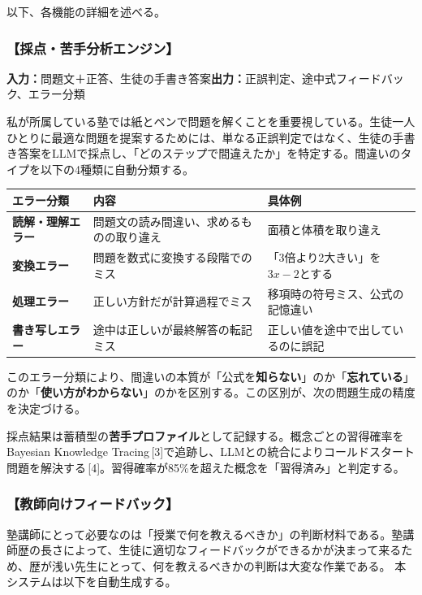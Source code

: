 \documentclass[paper=a4,fontsize=10.5bp,jafontsize=10.5bp,twocolumn]{jlreq}
\begin{document}
以下、各機能の詳細を述べる。

\subsubsection{【採点・苦手分析エンジン】}

\noindent\textbf{入力：}問題文＋正答、生徒の手書き答案\quad\textbf{出力：}正誤判定、途中式フィードバック、エラー分類

私が所属している塾では紙とペンで問題を解くことを重要視している。生徒一人ひとりに最適な問題を提案するためには、単なる正誤判定ではなく、生徒の手書き答案をLLMで採点し、「どのステップで間違えたか」を特定する。間違いのタイプを以下の4種類に自動分類する。

\begin{scriptsize}\noindent
\begin{tabularx}{\linewidth}{>{\bfseries}l X X}
\toprule
エラー分類 & 内容 & 具体例 \\
\midrule
読解・理解エラー & 問題文の読み間違い、求めるものの取り違え & 面積と体積を取り違え \\
変換エラー & 問題を数式に変換する段階でのミス & 「3倍より2大きい」を$3x-2$とする \\
処理エラー & 正しい方針だが計算過程でミス & 移項時の符号ミス、公式の記憶違い \\
書き写しエラー & 途中は正しいが最終解答の転記ミス & 正しい値を途中で出しているのに誤記 \\
\bottomrule
\end{tabularx}
\end{scriptsize}

このエラー分類により、間違いの本質が「公式を\textbf{知らない}」のか「\textbf{忘れている}」のか「\textbf{使い方がわからない}」のかを区別する。この区別が、次の問題生成の精度を決定づける。

採点結果は蓄積型の\textbf{苦手プロファイル}として記録する。概念ごとの習得確率をBayesian Knowledge Tracing\,[3]で追跡し、LLMとの統合によりコールドスタート問題を解決する\,[4]。習得確率が85\%を超えた概念を「習得済み」と判定する。

\subsubsection{【教師向けフィードバック】}

塾講師にとって必要なのは「授業で何を教えるべきか」の判断材料である。塾講師歴の長さによって、生徒に適切なフィードバックができるかが決まって来るため、歴が浅い先生にとって、何を教えるべきかの判断は大変な作業である。
本システムは以下を自動生成する。
\end{document}
